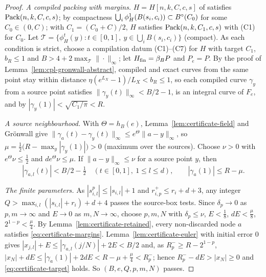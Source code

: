 \begin{proof}
\emph{A compiled packing with margins.} $H=H[n,k,C,c,s]$ of  satisfies $\mathrm{Pack}(n,k,C,c,s)$; by compactness $\bigcup_i\phi^1_H(B(s_i,c_i))\subset B^{\circ}(C_0)$ for some $C_0\in(0,C)$; with $C_1=(C_0+C)/2$, $H$ satisfies $\mathrm{Pack}(n,k,C_1,c,s)$ with (C1) for $C_0$. Let $\mathcal T=\{\phi^t_H(y):t\in[0,1],\ y\in\bigcup_iB(s_i,c_i)\}$ (compact). As each condition is strict, choose a compilation datum (C1)--(C7) for $H$ with target $C_1$, $b_R\le1$ and $B>4+2\max_{\mathcal T}\|\cdot\|_\infty$; let $H_{\mathrm{fin}}=\beta_BP$ and $P_e=P$. By the proof of Lemma~\ref{lem:cpl-gronwall-abstract}, compiled and exact curves from the same point stay within distance $\eta(e^{L_X}-1)/L_X<b_R\le1$, so each compiled curve $\gamma_y$ from a source point satisfies $\|\gamma_y(t)\|_\infty<B/2-1$, is an integral curve of $F_e$, and by  $|\gamma_y(1)|<\sqrt{C_1/\pi}<R$.

\emph{A source neighbourhood.} With $\Theta=h_B(e)$, Lemma~\ref{lem:certificate-field} and Gr\"onwall give $\|\gamma_a(t)-\gamma_y(t)\|_\infty\le e^\Theta\|a-y\|_\infty$, so $\mu=\frac12\bigl(R-\max_y|\gamma_y(1)|\bigr)>0$ (maximum over the sources). Choose $\nu>0$ with $e^\Theta\nu\le\frac12$ and $de^\Theta\nu\le\mu$. If $\|a-y\|_\infty\le\nu$ for a source point $y$, then
\begin{equation}\label{eq:certificate-margins}
 |\gamma_{a,l}(t)|<B/2-\tfrac12\quad(t\in[0,1],\ 1\le l\le d),\qquad |\gamma_a(1)|\le R-\mu .
\end{equation}

\emph{The finite parameters.} As $|s^p_{i,l}|\le|s_{i,l}|+1$ and $r^+_{i,p}\le r_i+d+3$, any integer $Q>\max_{i,l}(|s_{i,l}|+r_i)+d+4$ passes the source-box tests. Since $\delta_p\to0$ as $p,m\to\infty$ and $E\to0$ as $m,N\to\infty$, choose $p,m,N$ with $\delta_p\le\nu$, $E<\frac18$, $dE<\frac\mu8$, $2^{1-p}<\frac\mu4$. By Lemma~\ref{lem:certificate-retained}, every non-discarded node $a$ satisfies \eqref{eq:certificate-margins}. Lemma~\ref{lem:certificate-euler} with initial error $0$ gives $|x_{j,l}|+E\le|\gamma_{a,l}(j/N)|+2E<B/2$ and, as $R^-_p\ge R-2^{1-p}$, $|x_N|+dE\le|\gamma_a(1)|+2dE<R-\mu+\frac\mu4<R^-_p$; hence $R^-_p-dE>|x_N|\ge0$ and \eqref{eq:certificate-target} holds. So $(B,e,Q,p,m,N)$ passes.
\end{proof}
